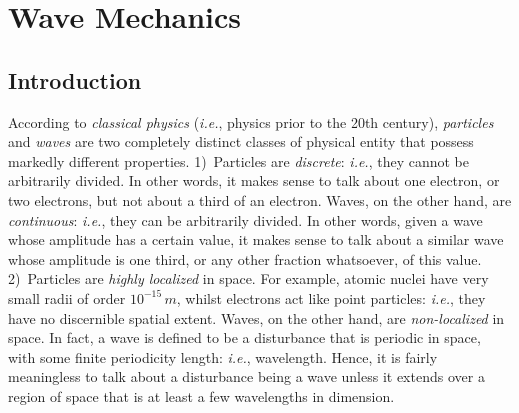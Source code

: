 \chapter{Wave Mechanics}

\section{Introduction}
According to {\em classical physics}\/ ({\em i.e.}, physics prior to the 20th century), {\em particles}\/ and {\em waves}\/
are two completely distinct classes of physical entity that possess markedly 
 different properties. 1)~Particles are {\em discrete}: {\em i.e.}, they cannot be arbitrarily divided. 
In other words,  it makes sense to talk about one electron, or two electrons, but not  about a third of an electron. Waves, on the
other hand, are {\em continuous}: {\em i.e.}, they can be arbitrarily divided. In other words, given a wave whose amplitude has a certain value,  it makes sense to talk about a similar wave whose amplitude is one third, or any other fraction  whatsoever, of this value. 2)~Particles are {\em highly
 localized}\/ in space.  For example, atomic nuclei  have very small radii of order $10^{-15}\,m$, whilst
electrons act like point particles: {\em i.e.}, they  have no discernible  spatial extent.
Waves, on the other hand, are {\em non-localized}\/ in space. In fact, a wave is defined to be a disturbance that
is periodic in space, with some finite periodicity length: {\em i.e.}, wavelength. Hence, it is fairly meaningless to
talk about a disturbance being a wave unless it extends over
a region of space that is at least a few wavelengths in dimension.

